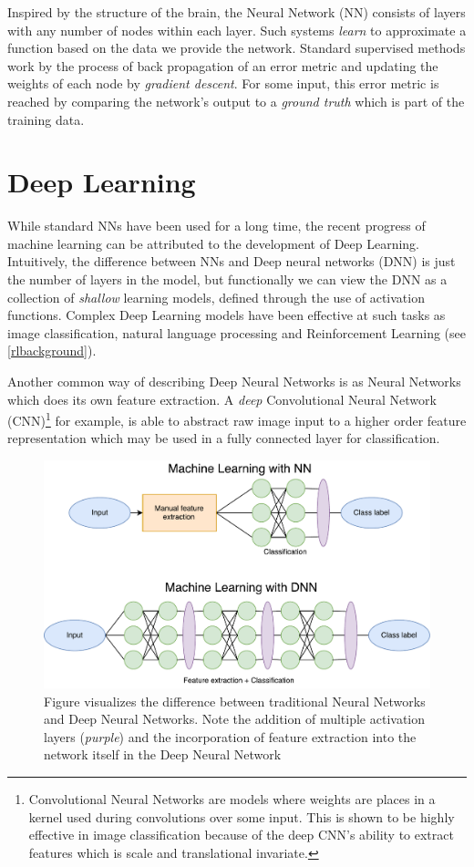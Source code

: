 \documentclass[a4paper,english]{report}
\begin{document}
Inspired by the structure of the brain, the Neural Network (NN) consists of layers with any number of nodes within each layer. Such systems \textit{learn} to approximate a function based on the data we provide the network. Standard supervised methods work by the process of back propagation of an error metric and updating the weights of each node by \textit{gradient descent}. For some input, this error metric is reached by comparing the network's output to a \textit{ground truth} which is part of the training data.   

\section{Deep Learning}
While standard NNs have been used for a long time, the recent progress of machine learning can be attributed to the development of Deep Learning. Intuitively, the difference between NNs and Deep neural networks (DNN) is just the number of layers in the model, but functionally we can view the DNN as a collection of \textit{shallow} learning models, defined through the use of activation functions. Complex Deep Learning models have been effective at such tasks as image classification\cite{imageclassification}, natural language processing\cite{deepnlp} and Reinforcement Learning (see \ref{rlbackground}). 

Another common way of describing Deep Neural Networks is as Neural Networks which does its own feature extraction. A \textit{deep} Convolutional Neural Network (CNN)\footnote{Convolutional Neural Networks are models where weights are places in a kernel used during convolutions over some input. This is shown to be highly effective in image classification because of the deep CNN's ability to extract features which is scale and translational invariate.} for example, is able to abstract raw image input to a higher order feature representation which may be used in a fully connected layer for classification.
\begin{figure}
\centering
\includegraphics[width=0.8\linewidth]{figures/NNvsDNN.pdf}
\caption{Figure visualizes the difference between traditional Neural Networks and Deep Neural Networks. Note the addition of multiple activation layers (\textit{purple}) and the incorporation of feature extraction into the network itself in the Deep Neural Network}
\label{fig:NNvsDNN}
\end{figure}
\end{document}
